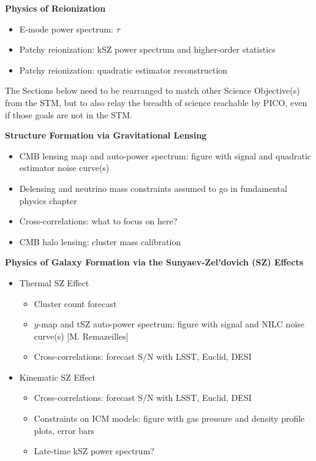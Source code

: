 \documentclass[PICOReport.tex]{subfiles}
\begin{document}

{\bf Physics of Reionization}
\begin{itemize}
\item E-mode power spectrum: $\tau$
\item Patchy reionization: kSZ power spectrum and higher-order statistics
\item Patchy reionization: quadratic estimator reconstruction
\end{itemize}

The Sections below need to be rearranged to match other Science Objective(s) from the STM, but to also relay the 
breadth of science reachable by PICO, even if those goals are not in the STM. 

{\bf Structure Formation via Gravitational Lensing}
\begin{itemize}
\item CMB lensing map and auto-power spectrum: figure with signal and quadratic estimator noise curve(s)
\item Delensing and neutrino mass constraints assumed to go in fundamental physics chapter
\item Cross-correlations: what to focus on here?
\item CMB halo lensing: cluster mass calibration
\end{itemize}

{\bf Physics of Galaxy Formation via the Sunyaev-Zel'dovich (SZ) Effects}
\begin{itemize}
\item{Thermal SZ Effect}
\begin{itemize}
\item Cluster count forecast
\item{$y$-map and tSZ auto-power spectrum: figure with signal and NILC noise curve(s) [M. Remazeilles]}
\item Cross-correlations: forecast S/N with LSST, Euclid, DESI
\end{itemize}
\item Kinematic SZ Effect
\begin{itemize}
\item Cross-correlations: forecast S/N with LSST, Euclid, DESI
\item Constraints on ICM models: figure with gas pressure and density profile plots, error bars
\item Late-time kSZ power spectrum?
\end{itemize}
\end{itemize}
\end{document}
